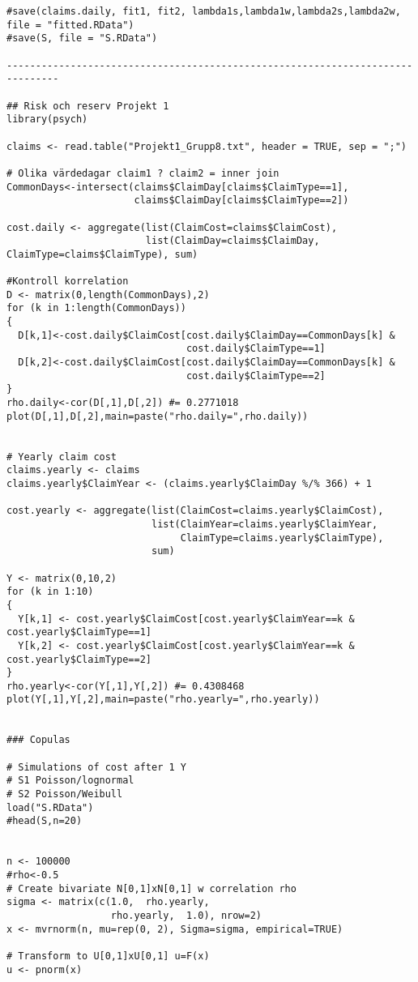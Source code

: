\documentclass[11pt]{article}
\begin{document}
\begin{verbatim}
#save(claims.daily, fit1, fit2, lambda1s,lambda1w,lambda2s,lambda2w, file = "fitted.RData")
#save(S, file = "S.RData")

-------------------------------------------------------------------------------

## Risk och reserv Projekt 1
library(psych)

claims <- read.table("Projekt1_Grupp8.txt", header = TRUE, sep = ";")

# Olika värdedagar claim1 ? claim2 = inner join
CommonDays<-intersect(claims$ClaimDay[claims$ClaimType==1],
                      claims$ClaimDay[claims$ClaimType==2])

cost.daily <- aggregate(list(ClaimCost=claims$ClaimCost),
                        list(ClaimDay=claims$ClaimDay, ClaimType=claims$ClaimType), sum)

#Kontroll korrelation
D <- matrix(0,length(CommonDays),2)
for (k in 1:length(CommonDays))
{
  D[k,1]<-cost.daily$ClaimCost[cost.daily$ClaimDay==CommonDays[k] &
                               cost.daily$ClaimType==1]
  D[k,2]<-cost.daily$ClaimCost[cost.daily$ClaimDay==CommonDays[k] &
                               cost.daily$ClaimType==2]
}
rho.daily<-cor(D[,1],D[,2]) #= 0.2771018
plot(D[,1],D[,2],main=paste("rho.daily=",rho.daily))


# Yearly claim cost
claims.yearly <- claims
claims.yearly$ClaimYear <- (claims.yearly$ClaimDay %/% 366) + 1

cost.yearly <- aggregate(list(ClaimCost=claims.yearly$ClaimCost),
                         list(ClaimYear=claims.yearly$ClaimYear,
                              ClaimType=claims.yearly$ClaimType),
                         sum)

Y <- matrix(0,10,2)
for (k in 1:10)
{
  Y[k,1] <- cost.yearly$ClaimCost[cost.yearly$ClaimYear==k & cost.yearly$ClaimType==1]
  Y[k,2] <- cost.yearly$ClaimCost[cost.yearly$ClaimYear==k & cost.yearly$ClaimType==2]
}
rho.yearly<-cor(Y[,1],Y[,2]) #= 0.4308468
plot(Y[,1],Y[,2],main=paste("rho.yearly=",rho.yearly))


### Copulas

# Simulations of cost after 1 Y
# S1 Poisson/lognormal
# S2 Poisson/Weibull
load("S.RData")
#head(S,n=20)


n <- 100000
#rho<-0.5
# Create bivariate N[0,1]xN[0,1] w correlation rho
sigma <- matrix(c(1.0,  rho.yearly,
                  rho.yearly,  1.0), nrow=2)
x <- mvrnorm(n, mu=rep(0, 2), Sigma=sigma, empirical=TRUE)

# Transform to U[0,1]xU[0,1] u=F(x)
u <- pnorm(x)


\end{verbatim}
\end{document}
